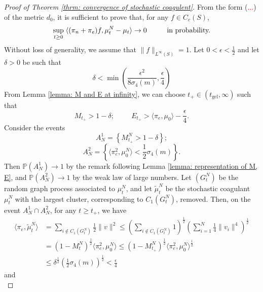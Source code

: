 \begin{proof}[Proof of Theorem \ref{thrm: convergence of stochastic coagulent}] From the form (\textcolor{red}{...}) of the metric $d_0$, it is sufficient to prove that, for any $f\in C_c(S)$, \begin{equation}
    \sup_{t\geq 0}\hspace{0.1cm} \langle(\pi_n+\pi_e)f, \mu^N_t-\mu_t \rangle \rightarrow 0 \hspace{1cm} \text{in probability.}
\end{equation} Without loss of generality, we assume that $\|f\|_{L^\infty(S)}=1.$ Let $0<\epsilon<\frac{1}{2}$ and let $\delta>0$ be such that \begin{equation}
    \delta< \min\left(\frac{\epsilon^2}{8\sigma_4(m)}, \frac{\epsilon}{4}\right)
\end{equation}
    From Lemma \ref{lemma: M and E at infinity}, we can choose $t_+\in (t_\text{gel}, \infty)$ such that \begin{equation}
        M_{t_+}>1-\delta;\hspace{1cm}E_{t_+}>\langle \pi_e, \mu_0\rangle -\frac{\epsilon}{4}. 
    \end{equation}Consider the events
    \begin{equation}
        A^1_N=\left\{M^N_{t_+}>1-\delta \right\};
    \end{equation}
    \begin{equation} A^2_N = \left \{\langle \pi_e^2, \mu^N_0\rangle <\frac{1}{2}\sigma_4(m)\right\}.\end{equation} Then $\mathbb{P}(A^1_N)\rightarrow 1$ by the remark following Lemma \ref{lemma: representation of M, E}, and $\mathbb{P}(A^2_N)\rightarrow 1$ by the weak law of large numbers. Let $(G^N_t)$ be the random graph process associated to $\mu^N_t$, and let $\widetilde{\mu}^N_t$ be the stochastic coagulant $\mu^N_t$ with the largest cluster, corresponding to $C_1(G^N_t)$, removed.  Then, on the event $A^1_N\cap A^2_N$, for any $t\geq t_+$, we have \begin{equation} \begin{split}
\langle \pi_e, \widetilde{\mu}^N_t\rangle & =\sum_{i\not \in C_1(G^N_t)}\frac{1}{2}\|v\|^2 \leq \left(\sum_{i \not\in C_1(G^N_t)} 1 \right)^\frac{1}{2} \left(\sum_{i =1}^N \frac{1}{4}\|v_i\|^4 \right)^\frac{1}{2}\\[2ex] & =(1-M^N_t)^\frac{1}{2} \langle \pi_e^2, \mu^N_0\rangle  \leq (1-M^N_{t_+})^\frac{1}{2}\langle \pi_e^2, \mu^N_0\rangle ^\frac{1}{2} \\[2ex] &\leq \delta^\frac{1}{2} \left(\frac{1}{2}\sigma_4(m)\right)^\frac{1}{2}<\frac{\epsilon}{4} \end{split} \end{equation} and \begin{equation}

\end{equation}
\end{proof}

